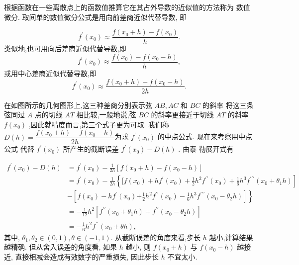根据函数在一些离散点上的函数值推算它在其占外导数的近似值的方法称为 数值微分. 取间单的数值微分公式是用向前差商近似代替导数, 即

$$f^{{\prime}}\left( x_{0} \right) {\approx} \frac{f\left( x_{0} + h \right) {-} f\left( x_{0} \right)}{h}.$$
类似地,也可用向后差商近似代替导数,即
$$f^{{\prime}}\left( x_{0} \right) {\approx} \frac{f\left( x_{0} \right) {-} f\left( x_{0} {-} h \right)}{h},$$
或用中心差商近似代替导数,即
$$f^{{\prime}}\left( x_{0} \right) {\approx} \frac{f\left( x_{0} + h \right) {-} f\left( x_{0} {-} h \right)}{2h}.$$

\begin{window}
 在如图所示的几何图形上,这三种差商分别表示弦 $AB,AC$ 和 $BC$ 的斜率 将这三条弦同过 $A$ 点的切线 $AT$ 相比较,一般地说,弦 $BC$ 的斜率更接近于切线 $AT$  的斜率 $f\left( x_{0} \right)$ ,因此就精度而言,第三个式子更为可取. 
 我们称
$D(h) = \dfrac{f\left( x_{0} + h \right) {-} f\left( x_{0} {-} h \right)}{2h}$为求 $f^{{\prime}}\left( x_{0} \right)$ 的中点公式.
现在来考察用中点公式 代替 $f^{{\prime}}\left( x_{0} \right)$ 所产生的截断误差 $f^{{\prime}}\left( x_{0} \right) {-} D(h)$ . 由泰 勒展开式有
\end{window}



$$\begin{aligned}
    f^{{\prime}}\left( x_{0} \right) {-} D(h) &= f^{{\prime}}\left( x_{0} \right) {-} \frac{1}{2h}\left\lbrack f\left( x_{0} + h \right) {-} f\left( x_{0} {-} h \right) \right\rbrack\\
    &= f^{{\prime}}\left( x_{0} \right) {-} \frac{1}{2h}\left\{\lbrack f\left( x_{0} \right) + hf^{{\prime}}\left( x_{0} \right) + \frac{1}{2}h^{2}f^{{\prime}{\prime}}\left( x_{0} \right)  +\frac{1}{6}h^{3}f^{{\prime}{\prime}{\prime}}\left( x_{0} + {\theta}_{1}h \right) \right\rbrack \\&{-} \left\lbrack f\left( x_{0} \right) {-} hf^{{\prime}}\left( x_{0} \right) \right.\left. \left. +\frac{1}{2}h^{2}f^{{\prime}{\prime}}\left( x_{0} \right) {-} \frac{1}{6}h^{3}f^{{\prime}{\prime}{\prime}}\left( x_{0} {-} {\theta}_{2}h \right) \right\rbrack \right\}\\
    &=-\frac{1}{12} h^{2}\left[f^{\prime \prime}\left(x_{0}+\theta_{1} h\right)+f^{\prime \prime}\left(x_{0}-\theta_{2} h\right)\right] \\
&=-\frac{1}{6} h^{2} f^{\prime \prime}\left(x_{0}+\theta h\right),
\end{aligned}$$
其中, $ \theta_{1}, \theta_{2} \in(0,1), \theta \in(-1,1) $.
从截断误差的角度来看,步长 $ h $ 越小,计算结果越精确. 但从舍入误差的角度看, 如果 $ h $ 越小, 则 $ f\left(x_{0}+h\right) $ 与 $ f\left(x_{0}-h\right) $ 越接近, 直接相减会造成有效数字的严重损失, 因此步长 $ h $ 不宜太小. %


